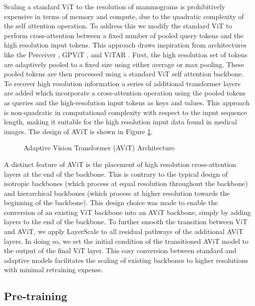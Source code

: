 \documentclass[12pt]{article}
\begin{document}
Scaling a standard ViT to the resolution of mammograms is prohibitively expensive in terms of memory and compute, due to the quadratic complexity of the self attention operation.
To address this we modify the standard ViT to perform cross-attention between a fixed number of pooled query tokens and the high resolution input tokens. This approach draws inspiration
from architectures like the Perceiver \cite{jaegle2021perceiver}, GPViT \cite{yang2023gpvit}, and ViTAR \cite{fan2024vitar}. First, the high resolution set of tokens are adaptively pooled to a
fixed size using either average or max pooling. These pooled tokens are then processed using a standard ViT self attention backbone. To recover high resolution information a series of
additional transformer layers are added which incorporate a cross-attention operation using the pooled tokens as queries and the high-resolution input tokens as keys and values. 
This approach is non-quadratic in computational complexity with respect to the input sequence length, making it suitable for the high resolution input data found in medical images.
The design of AViT is shown in Figure \ref{fig:avit}.

\begin{figure}[H]
    \centering
    
    \caption{Adaptive Vision Transformer (AViT) Architecture}
    \label{fig:avit}
\end{figure}

A distinct feature of AViT is the placement of high resolution cross-attention layers at the end of the backbone. This is contrary to the typical design of isotropic backbones 
(which process at equal resolution throughout the backbone) and hierarchical backbones (which process at higher resolution towards the beginning of the backbone). This design choice
was made to enable the conversion of an existing ViT backbone into an AViT backbone, simply by adding layers to the end of the backbone. 
To further smooth the transition between ViT and AViT, we apply LayerScale \cite{touvron2021deeper} to all residual pathways of the additional AViT layers. In doing so, we set the initial condition of the transitioned AViT model to the output of the final ViT layer.
This easy conversion between standard and adaptive
models facilitates the scaling of existing backbones to higher resolutions with minimal retraining expense.


\subsection{Pre-training}
\end{document}

